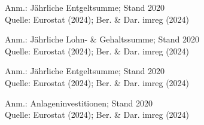 \begin{figure}[p]
	{\centering {}}
	\label{map:entgeltvg}
	\begin{spacing}{1} \scriptsize
		Anm.: Jährliche Entgeltsumme; Stand 2020\\
		Quelle: Eurostat (2024); Ber. \& Dar. imreg (2024) \end{spacing}
\end{figure}

\begin{figure}[p]
	{\centering {}}
	\label{map:entgeltvg2}
	\begin{spacing}{1} \scriptsize
		Anm.: Jährliche Lohn- \& Gehaltssumme; Stand 2020\\
		Quelle: Eurostat (2024); Ber. \& Dar. imreg (2024) \end{spacing}
\end{figure}


\begin{figure}[p]
	{\centering {}}
	\label{map:entgeltprostundevg}
	\begin{spacing}{1} \scriptsize
		Anm.: Jährliche Entgeltsumme; Stand 2020\\
		Quelle: Eurostat (2024); Ber. \& Dar. imreg (2024) 
	\end{spacing}
\end{figure}


\begin{figure}[p]
	{\centering {}}
	\label{map:investvg}
	\begin{spacing}{1} \scriptsize
		Anm.: Anlageninvestitionen; Stand 2020\\
		Quelle: Eurostat (2024); Ber. \& Dar. imreg (2024) 
	\end{spacing}
\end{figure}

